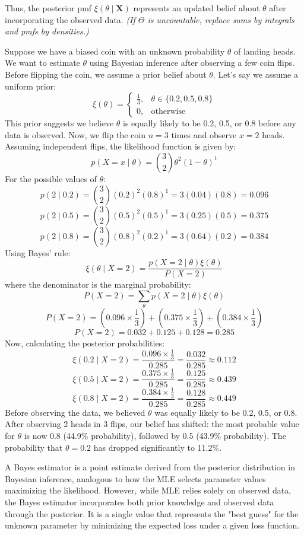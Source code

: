 Thus, the posterior pmf $\xi(\theta \mid \mathbf{X})$ represents an updated belief about $\theta$ after incorporating the observed data. \emph{(If $\Theta$ is uncountable, replace sums by integrals and pmfs by densities.)}

\begin{example}
Suppose we have a biased coin with an unknown probability \(\theta\) of landing heads. We want to estimate \(\theta\) using Bayesian inference after observing a few coin flips. Before flipping the coin, we assume a prior belief about \(\theta\). Let's say we assume a uniform prior:
\[
\xi(\theta) = 
\begin{cases}
\frac{1}{3}, & \theta \in \{0.2, 0.5, 0.8\} \\
0, & \text{otherwise}
\end{cases}
\]
This prior suggests we believe \(\theta\) is equally likely to be 0.2, 0.5, or 0.8 before any data is observed. Now, we flip the coin \(n=3\) times and observe \(x=2\) heads. Assuming independent flips, the likelihood function is given by:
\[
p(X = x \mid \theta) = \binom{3}{2} \theta^2 (1 - \theta)^1
\]
For the possible values of \(\theta\):
\[
p(2 \mid 0.2) = \binom{3}{2} (0.2)^2 (0.8)^1 = 3(0.04)(0.8) = 0.096
\]
\[
p(2 \mid 0.5) = \binom{3}{2} (0.5)^2 (0.5)^1 = 3(0.25)(0.5) = 0.375
\]
\[
p(2 \mid 0.8) = \binom{3}{2} (0.8)^2 (0.2)^1 = 3(0.64)(0.2) = 0.384
\]
Using Bayes' rule:
\[
\xi(\theta \mid X = 2) = \frac{p(X = 2 \mid \theta) \xi(\theta)}{P(X = 2)}
\]
where the denominator is the marginal probability:
\[
P(X = 2) = \sum_{\theta} p(X = 2 \mid \theta) \xi(\theta)
\]
\[
P(X = 2) = (0.096 \times \frac{1}{3}) + (0.375 \times \frac{1}{3}) + (0.384 \times \frac{1}{3})
\]
\[
P(X = 2) = 0.032 + 0.125 + 0.128 = 0.285
\]
Now, calculating the posterior probabilities:
\[
\xi(0.2 \mid X = 2) = \frac{0.096 \times \frac{1}{3}}{0.285} = \frac{0.032}{0.285} \approx 0.112
\]
\[
\xi(0.5 \mid X = 2) = \frac{0.375 \times \frac{1}{3}}{0.285} = \frac{0.125}{0.285} \approx 0.439
\]
\[
\xi(0.8 \mid X = 2) = \frac{0.384 \times \frac{1}{3}}{0.285} = \frac{0.128}{0.285} \approx 0.449
\]
Before observing the data, we believed \(\theta\) was equally likely to be 0.2, 0.5, or 0.8. After observing 2 heads in 3 flips, our belief has shifted: the most probable value for \(\theta\) is now 0.8 (44.9\% probability), followed by 0.5 (43.9\% probability). The probability that \(\theta = 0.2\) has dropped significantly to 11.2\%.
\end{example}

A Bayes estimator is a point estimate derived from the posterior distribution in Bayesian inference, analogous to how the MLE selects parameter values maximizing the likelihood. However, while MLE relies solely on observed data, the Bayes estimator incorporates both prior knowledge and observed data through the posterior. It is a single value that represents the "best guess" for the unknown parameter by minimizing the expected loss under a given loss function.

